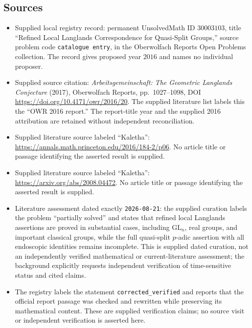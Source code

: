 \documentclass[11pt]{article}
\begin{document}
\subsection{Sources}
\begin{itemize}
\item Supplied local registry record: permanent UnsolvedMath ID \(30003103\), title ``Refined Local Langlands Correspondence for Quasi-Split Groups,'' source problem code \texttt{catalogue entry}, in the Oberwolfach Reports Open Problems collection. The record gives proposed year \(2016\) and names no individual proposer.
\item Supplied source citation: \emph{Arbeitsgemeinschaft: The Geometric Langlands Conjecture} (2017), Oberwolfach Reports, pp.~1027--1098, DOI \url{https://doi.org/10.4171/owr/2016/20}. The supplied literature list labels this the ``OWR 2016 report.'' The report-title year and the supplied 2016 attribution are retained without independent reconciliation.
\item Supplied literature source labeled ``Kaletha'': \url{https://annals.math.princeton.edu/2016/184-2/p06}. No article title or passage identifying the asserted result is supplied.
\item Supplied literature source labeled ``Kaletha'': \url{https://arxiv.org/abs/2008.04472}. No article title or passage identifying the asserted result is supplied.
\item Literature assessment dated exactly \texttt{2026-08-21}: the supplied curation labels the problem ``partially solved'' and states that refined local Langlands assertions are proved in substantial cases, including \(\mathrm{GL}_n\), real groups, and important classical groups, while the full quasi-split \(p\)-adic assertion with all endoscopic identities remains incomplete. This is supplied dated curation, not an independently verified mathematical or current-literature assessment; the background explicitly requests independent verification of time-sensitive status and cited claims.
\item The registry labels the statement \texttt{corrected\_verified} and reports that the official report passage was checked and rewritten while preserving its mathematical content. These are supplied verification claims; no source visit or independent verification is asserted here.
\end{itemize}
\end{document}
